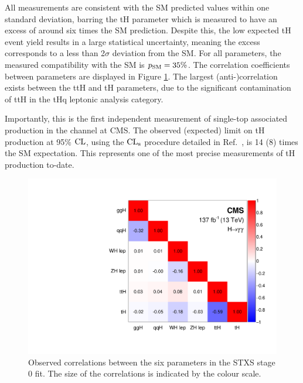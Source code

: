 All measurements are consistent with the SM predicted values within one standard deviation, barring the tH parameter which is measured to have an excess of around six times the SM prediction. Despite this, the low expected tH event yield results in a large statistical uncertainty, meaning the excess corresponds to a less than 2$\sigma$ deviation from the SM. For all parameters, the measured compatibility with the SM is $p_{\rm{SM}}=35\%$. The correlation coefficients between parameters are displayed in Figure \ref{fig:stage0_correlations}. The largest (anti-)correlation exists between the ttH and tH parameters, due to the significant contamination of ttH in the tHq leptonic analysis category.

Importantly, this is the first independent measurement of single-top associated production in the \Hgg channel at CMS. The observed (expected) limit on tH production at 95\% $\rm{CL}$, using the $\rm{CL}_s$ procedure detailed in Ref.~\cite{CMS-NOTE-2011-005}, is 14 (8) times the SM expectation. This represents one of the most precise measurements of tH production to-date.

\begin{figure}[htbp]
  \centering
  \includegraphics[width=.5\textwidth]{Figures/hgg_results/stage0_correlations.pdf}
  \caption[Correlations in the STXS stage 0 parameters]
  {
    Observed correlations between the six parameters in the STXS stage 0 fit. The size of the correlations is indicated by the colour scale.
  }
  \label{fig:stage0_correlations}
\end{figure}

